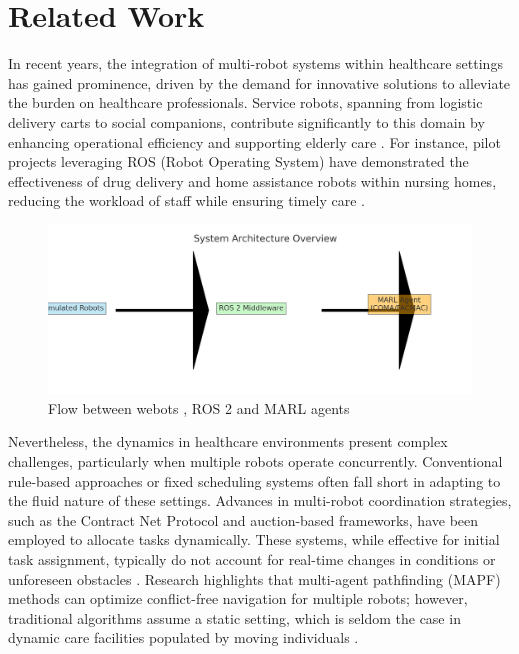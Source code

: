 \documentclass[conference]{IEEEtran}
\begin{document}
\section{Related Work}
\label{sec:related}
In recent years, the integration of multi-robot systems within healthcare settings has gained prominence, driven by the demand for innovative solutions to alleviate the burden on healthcare professionals. Service robots, spanning from logistic delivery carts to social companions, contribute significantly to this domain by enhancing operational efficiency and supporting elderly care \citep{bonaccosi2016}. For instance, pilot projects leveraging ROS (Robot Operating System) have demonstrated the effectiveness of drug delivery and home assistance robots within nursing homes, reducing the workload of staff while ensuring timely care \citep{salinas2023}.
\begin{figure}
    \centering
    \includegraphics[width=1\linewidth]{architecture_overview.png}
    \caption{Flow between webots , ROS 2 and MARL agents }
    \label{fig:placeholder}
\end{figure}
Nevertheless, the dynamics in healthcare environments present complex challenges, particularly when multiple robots operate concurrently. Conventional rule-based approaches or fixed scheduling systems often fall short in adapting to the fluid nature of these settings. Advances in multi-robot coordination strategies, such as the Contract Net Protocol and auction-based frameworks, have been employed to allocate tasks dynamically. These systems, while effective for initial task assignment, typically do not account for real-time changes in conditions or unforeseen obstacles \citep{kayy2017, salinas2023}. Research highlights that multi-agent pathfinding (MAPF) methods can optimize conflict-free navigation for multiple robots; however, traditional algorithms assume a static setting, which is seldom the case in dynamic care facilities populated by moving individuals \citep{sharon2015}.
\end{document}
